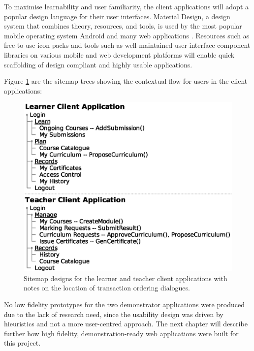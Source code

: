To maximise learnability and user familiarity, the client applications will adopt a popular design language for their user interfaces.
Material Design, a design system that combines theory, resources, and tools, is used by the most popular mobile operating system Android 
and many web applications \citep{google2018material}. Resources such as free-to-use icon packs and tools such as well-maintained 
user interface component libraries on various mobile and web development platforms will enable quick scaffolding of design compliant and 
highly usable applications.

Figure \ref{fig:sitemaps} are the sitemap trees showing the contextual flow for users in the client applications:

\begin{figure}[!ht]
	\centering
	\includegraphics[width=.6\textwidth]{sitemaps}
	\caption[Client Application Sitemaps]
	{Sitemap designs for the learner and teacher client applications with notes on the location of transaction ordering dialogues.} \label{fig:sitemaps}
\end{figure}

No low fidelity prototypes for the two demonstrator applications were produced due to the lack of research need, 
since the usability design was driven by hieuristics and not a more user-centred approach. The next chapter will 
describe further how high fidelity, demonstration-ready web applications were built for this project.